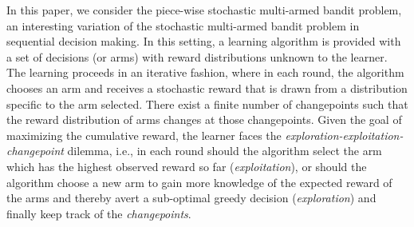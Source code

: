In this paper, we consider the piece-wise stochastic multi-armed bandit problem, an interesting variation of the stochastic multi-armed bandit problem in sequential decision making. In this setting,  a learning algorithm is provided with a set of decisions (or arms) with reward distributions unknown to the learner. The learning proceeds in an iterative fashion, where in each round, the algorithm chooses an arm and receives a stochastic reward that is drawn from a distribution specific to the arm selected. There exist a finite number of changepoints such that the reward distribution of arms changes at those changepoints. Given the goal of maximizing the cumulative reward, the learner faces the \textit{exploration-exploitation-changepoint} dilemma, i.e., in each round should the algorithm select the arm which has the highest observed reward so far (\textit{exploitation}), or should the algorithm choose a new arm to gain more knowledge of the expected reward of the arms and thereby avert a sub-optimal greedy decision (\textit{exploration}) and finally keep track of the \textit{changepoints}. 

